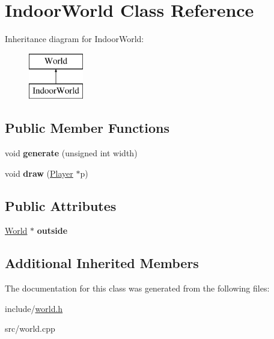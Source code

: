 \hypertarget{classIndoorWorld}{}\section{Indoor\+World Class Reference}
\label{classIndoorWorld}
Inheritance diagram for Indoor\+World\+:\begin{figure}[H]
\begin{center}
\leavevmode
\includegraphics[height=2.000000cm]{classIndoorWorld}
\end{center}
\end{figure}
\subsection*{Public Member Functions}
\begin{DoxyCompactItemize}
\item 
\hypertarget{classIndoorWorld_a06b929154c7dd3cafe6c81550df47494}{}void {\bfseries generate} (unsigned int width)\label{classIndoorWorld_a06b929154c7dd3cafe6c81550df47494}

\item 
\hypertarget{classIndoorWorld_ab201d18555af3121e897ccbe889c90ff}{}void {\bfseries draw} (\hyperlink{classPlayer}{Player} $\ast$p)\label{classIndoorWorld_ab201d18555af3121e897ccbe889c90ff}

\end{DoxyCompactItemize}
\subsection*{Public Attributes}
\begin{DoxyCompactItemize}
\item 
\hypertarget{classIndoorWorld_a3f9df1a8e4e6751fcb73f77f4bd174fa}{}\hyperlink{classWorld}{World} $\ast$ {\bfseries outside}\label{classIndoorWorld_a3f9df1a8e4e6751fcb73f77f4bd174fa}

\end{DoxyCompactItemize}
\subsection*{Additional Inherited Members}


The documentation for this class was generated from the following files\+:\begin{DoxyCompactItemize}
\item 
include/\hyperlink{world_8h}{world.\+h}\item 
src/world.\+cpp\end{DoxyCompactItemize}
